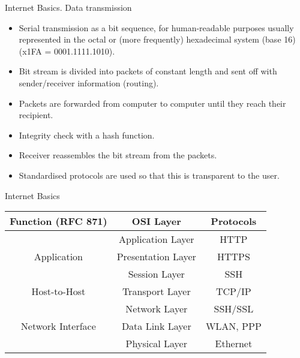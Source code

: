 \documentclass{beamer}
\begin{document}
\begin{frame}{Internet Basics. Data transmission}

\begin{itemize}
\item Serial transmission as a bit sequence, for human-readable purposes
  usually represented in the octal or (more frequently) hexadecimal system
  (base 16) (x1FA = 0001.1111.1010).
\item Bit stream is divided into packets of constant length and sent off with
  sender/receiver information (routing).
\item Packets are forwarded from computer to computer until they reach their
  recipient.
\item Integrity check with a hash function.
\item Receiver reassembles the bit stream from the packets.
\item Standardised protocols are used so that this is transparent to the user.
\end{itemize}
\end{frame}
\begin{frame}{Internet Basics}
  \begin{center}
    \begin{tabular}{|c|c|c|}\hline
      \textbf{Function} (RFC 871) & \textbf{OSI Layer} &
      \textbf{Protocols}\\\hline 
      &Application Layer & HTTP\\
      Application & Presentation Layer & HTTPS\\
      &Session Layer & SSH\\\hline
      Host-to-Host & Transport Layer & TCP/IP \\
      & Network Layer & SSH/SSL \\\hline 
      Network Interface & Data Link Layer & WLAN, PPP \\
      &Physical Layer & Ethernet \\\hline
    \end{tabular}
  \end{center}
\end{frame}
\end{document}
